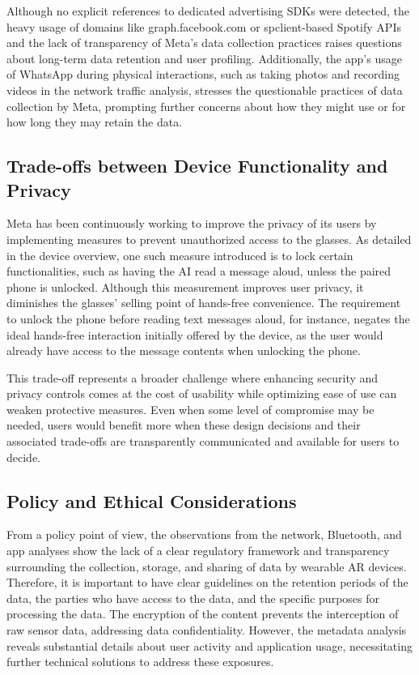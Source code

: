 Although no explicit references to dedicated advertising SDKs were detected, the heavy usage of domains like graph.facebook.com or spclient-based Spotify APIs and the lack of transparency of Meta's data collection practices raises questions about long-term data retention and user profiling. Additionally, the app's usage of WhatsApp during physical interactions, such as taking photos and recording videos in the network traffic analysis, stresses the questionable practices of data collection by Meta, prompting further concerns about how they might use or for how long they may retain the data. 


\subsection*{Trade-offs between Device Functionality and Privacy}
Meta has been continuously working to improve the privacy of its users by implementing measures to prevent unauthorized access to the glasses. As detailed in the device overview, one such measure introduced is to lock certain functionalities, such as having the AI read a message aloud, unless the paired phone is unlocked. Although this measurement improves user privacy, it diminishes the glasses' selling point of hands-free convenience. The requirement to unlock the phone before reading text messages aloud, for instance, negates the ideal hands-free interaction initially offered by the device, as the user would already have access to the message contents when unlocking the phone.

This trade-off represents a broader challenge where enhancing security and privacy controls comes at the cost of usability while optimizing ease of use can weaken protective measures. Even when some level of compromise may be needed, users would benefit more when these design decisions and their associated trade-offs are transparently communicated and available for users to decide. 


\subsection*{Policy and Ethical Considerations}
From a policy point of view, the observations from the network, Bluetooth, and app analyses show the lack of a clear regulatory framework and transparency surrounding the collection, storage, and sharing of data by wearable AR devices. Therefore, it is important to have clear guidelines on the retention periods of the data, the parties who have access to the data, and the specific purposes for processing the data. The encryption of the content prevents the interception of raw sensor data, addressing data confidentiality. However, the metadata analysis reveals substantial details about user activity and application usage, necessitating further technical solutions to address these exposures.

